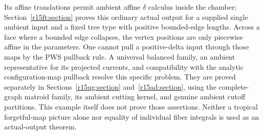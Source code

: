 Its affine translations permit ambient affine $\delta$ calculus
inside the chamber; Section~\ref{r15ft:section} proves this
ordinary actual output for a supplied single ambient input
and a fixed tree type with positive bounded-edge lengths.
Across a face where a bounded edge
collapses, the vertex positions are only piecewise affine in
the parameters.  One cannot pull a positive-delta input through
those maps by the PWS pullback rule.  A universal balanced
family, an ambient representative for its projected currents,
and compatibility with the analytic configuration-map pullback
resolve this specific problem.  They are proved separately
in Sections~\ref{r15ug:section} and~\ref{r15ad:section}, using
the complete-graph matroid family, its ambient cutting kernel,
and genuine ambient cutoff partitions.  This example itself
does not prove those assertions.  Neither a tropical
forgetful-map picture alone nor equality of individual fiber
integrals is used as an actual-output theorem.
